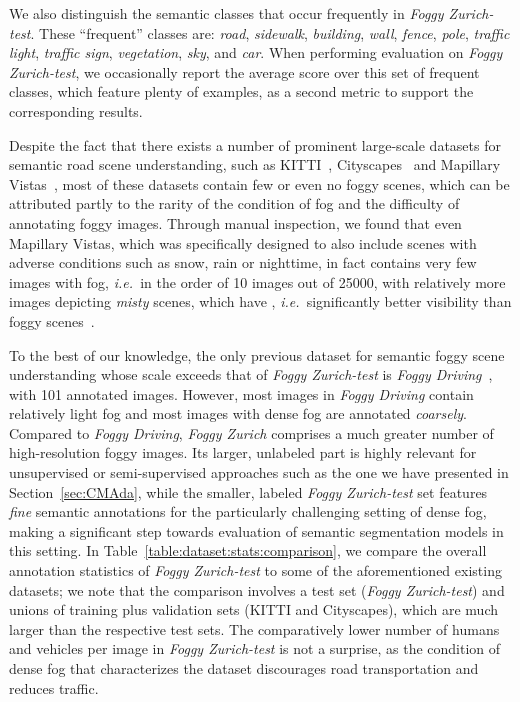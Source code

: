 \documentclass[twocolumn]{svjour3}          \smartqed  \usepackage{graphicx}
\newcommand{\ie}{\mbox{\emph{i.e.\ }}}
\begin{document}
We also distinguish the semantic classes that occur frequently in \emph{Foggy Zurich-test}. These ``frequent'' classes are: \emph{road}, \emph{sidewalk}, \emph{building}, \emph{wall}, \emph{fence}, \emph{pole}, \emph{traffic light}, \emph{traffic sign}, \emph{vegetation}, \emph{sky}, and \emph{car}. When performing evaluation on \emph{Foggy Zurich-test}, we occasionally report the average score over this set of frequent classes, which feature plenty of examples, as a second metric to support the corresponding results.

Despite the fact that there exists a number of prominent large-scale datasets for semantic road scene understanding, such as KITTI~\cite{kitti}, Cityscapes~\cite{Cityscapes} and Mapillary Vistas~\cite{Mapillary}, most of these datasets contain few or even no foggy scenes, which can be attributed partly to the rarity of the condition of fog and the difficulty of annotating foggy images. Through manual inspection, we found that even Mapillary Vistas, which was specifically designed to also include scenes with adverse conditions such as snow, rain or nighttime, in fact contains very few images with fog, \ie{}in the order of 10 images out of 25000, with relatively more images depicting \emph{misty} scenes, which have , \ie{}significantly better visibility than foggy scenes~\cite{Federal:meteorological:handbook}.

To the best of our knowledge, the only previous dataset for semantic foggy scene understanding whose scale exceeds that of \emph{Foggy Zurich-test} is \emph{Foggy Driving}~\cite{SFSU_synthetic}, with 101 annotated images. However, most images in \emph{Foggy Driving} contain relatively light fog and most images with dense fog are annotated \emph{coarsely}. Compared to \emph{Foggy Driving}, \emph{Foggy Zurich} comprises a much greater number of high-resolution foggy images. Its larger, unlabeled part is highly relevant for unsupervised or semi-supervised approaches such as the one we have presented in Section~\ref{sec:CMAda}, while the smaller, labeled \emph{Foggy Zurich-test} set features \emph{fine} semantic annotations for the particularly challenging setting of dense fog, making a significant step towards evaluation of semantic segmentation models in this setting. In Table~\ref{table:dataset:stats:comparison}, we compare the overall annotation statistics of \emph{Foggy Zurich-test} to some of the aforementioned existing datasets; we note that the comparison involves a test set (\emph{Foggy Zurich-test}) and unions of training plus validation sets (KITTI and Cityscapes), which are much larger than the respective test sets. The comparatively lower number of humans and vehicles per image in \emph{Foggy Zurich-test} is not a surprise, as the condition of dense fog that characterizes the dataset discourages road transportation and reduces traffic.
\end{document}
